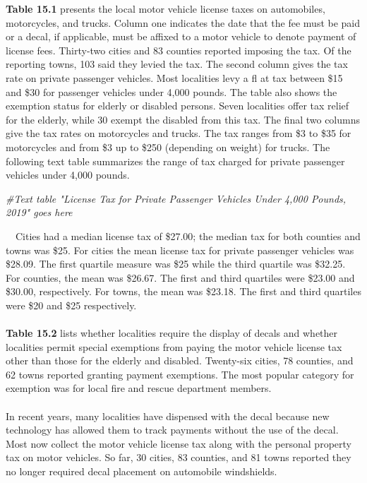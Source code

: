 \documentclass[
]{book}
\newenvironment{Shaded}{\begin{snugshade}}{\end{snugshade}}
\newcommand{\CommentTok}[1]{\textcolor[rgb]{0.56,0.35,0.01}{\textit{#1}}}
\begin{document}
\textbar{}
\textbar{} \textbf{Table 15.1} presents the local motor vehicle license taxes on automobiles, motorcycles, and trucks. Column one indicates the date that the fee must be paid or a decal, if applicable, must be affixed to a motor vehicle to denote payment of license fees. Thirty-two cities and 83 counties reported imposing the tax. Of the reporting towns, 103 said they levied the tax. The second column gives the tax rate on private passenger vehicles. Most localities levy a fl at tax between \$15 and \$30 for passenger vehicles under 4,000 pounds. The table also shows the exemption status for elderly or disabled persons. Seven localities offer tax relief for the elderly, while 30 exempt the disabled from this tax. The final two columns give the tax rates on motorcycles and trucks. The tax ranges from \$3 to \$35 for motorcycles and from \$3 up to \$250 (depending on weight) for trucks.
\textbar{}
\textbar{} The following text table summarizes the range of tax charged for private passenger vehicles under 4,000 pounds.

\begin{Shaded}
\begin{Highlighting}[]
\CommentTok{\#Text table "License Tax for Private Passenger Vehicles Under 4,000 Pounds, 2019" goes here}
\end{Highlighting}
\end{Shaded}

\hfill\break
~~Cities had a median license tax of \$27.00; the median tax for both counties and towns was \$25. For cities the mean license tax for private passenger vehicles was \$28.09. The first quartile measure was \$25 while the third quartile was \$32.25. For counties, the mean was \$26.67. The first and third quartiles were \$23.00 and \$30.00, respectively. For towns, the mean was \$23.18. The first and third quartiles were \$20 and \$25 respectively.\\
~\\
\hspace*{0.333em}\hspace*{0.333em}\textbf{Table 15.2} lists whether localities require the display of decals and whether localities permit special exemptions from paying the motor vehicle license tax other than those for the elderly and disabled. Twenty-six cities, 78 counties, and 62 towns reported granting payment exemptions. The most popular category for exemption was for local fire and rescue department members.\\
~\\
\hspace*{0.333em}\hspace*{0.333em}In recent years, many localities have dispensed with the decal because new technology has allowed them to track payments without the use of the decal. Most now collect the motor vehicle license tax along with the personal property tax on motor vehicles. So far, 30 cities, 83 counties, and 81 towns reported they no longer required decal placement on automobile windshields.\\
\end{document}
